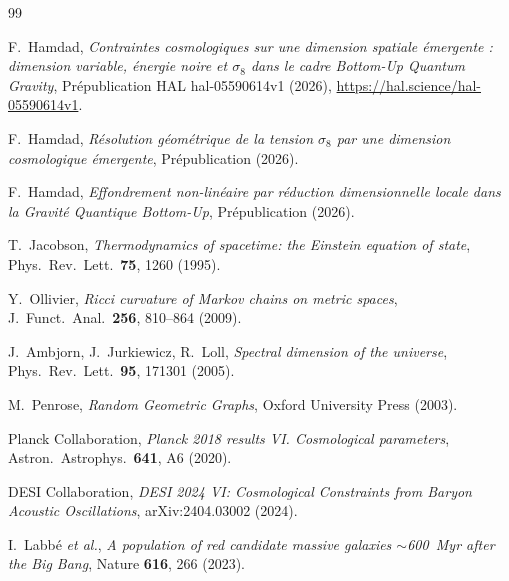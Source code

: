 \documentclass[11pt]{article}
\begin{document}

\begin{thebibliography}{99}

F.~Hamdad,
\textit{Contraintes cosmologiques sur une dimension spatiale \'emergente :
dimension variable, \'energie noire et $\sigma_8$ dans le cadre
Bottom-Up Quantum Gravity},
Pr\'epublication HAL hal-05590614v1 (2026),
\url{https://hal.science/hal-05590614v1}.

F.~Hamdad,
\textit{R\'esolution g\'eom\'etrique de la tension $\sigma_8$ par une
dimension cosmologique \'emergente},
Pr\'epublication (2026).

F.~Hamdad,
\textit{Effondrement non-lin\'eaire par r\'eduction dimensionnelle locale
dans la Gravit\'e Quantique Bottom-Up},
Pr\'epublication (2026).

T.~Jacobson,
\textit{Thermodynamics of spacetime: the Einstein equation of state},
Phys.\ Rev.\ Lett.\ \textbf{75}, 1260 (1995).

Y.~Ollivier,
\textit{Ricci curvature of Markov chains on metric spaces},
J.\ Funct.\ Anal.\ \textbf{256}, 810--864 (2009).

J.~Ambjorn, J.~Jurkiewicz, R.~Loll,
\textit{Spectral dimension of the universe},
Phys.\ Rev.\ Lett.\ \textbf{95}, 171301 (2005).

M.~Penrose,
\textit{Random Geometric Graphs},
Oxford University Press (2003).

Planck Collaboration,
\textit{Planck 2018 results VI. Cosmological parameters},
Astron.\ Astrophys.\ \textbf{641}, A6 (2020).

DESI Collaboration,
\textit{DESI 2024 VI: Cosmological Constraints from Baryon Acoustic
Oscillations},
arXiv:2404.03002 (2024).

I.~Labb\'e \textit{et al.},
\textit{A population of red candidate massive galaxies $\sim$600~Myr
after the Big Bang},
Nature \textbf{616}, 266 (2023).

\end{thebibliography}
\end{document}
